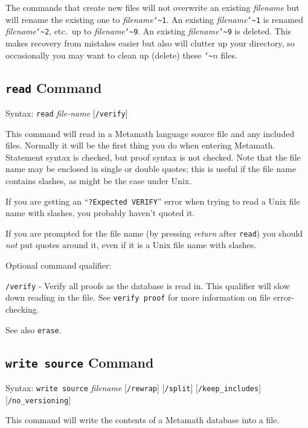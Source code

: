 The commands that create new files will not overwrite an existing {\em
filename} but will rename the existing one to {\em
filename}\texttt{{\char`\~}1}.  An existing {\em
filename}\texttt{{\char`\~}1} is renamed {\em
filename}\texttt{{\char`\~}2}, etc.\ up to {\em
filename}\texttt{{\char`\~}9}.  An existing {\em
filename}\texttt{{\char`\~}9} is deleted.  This makes recovery from
mistakes easier but also will clutter up your directory, so occasionally
you may want to clean up (delete) these \texttt{{\char`\~}}$n$ files.


\subsection{\texttt{read} Command}
Syntax:  \texttt{read} {\em file-name} [\texttt{/verify}]

This command will read in a Metamath language source file and any included
files.  Normally it will be the first thing you do when entering Metamath.
Statement syntax is checked, but proof syntax is not checked.
Note that the file name may be enclosed in single or double quotes;
this is useful if the file name contains slashes, as might be the case
under Unix.

If you are getting an ``\texttt{?Expected VERIFY}'' error
when trying to read a Unix file name with slashes, you probably haven't
quoted it.

If you are prompted for the file name (by pressing {\em return}
 after \texttt{read})
you should {\em not} put quotes around it, even if it is a Unix file name
with slashes.

Optional command qualifier:

    \texttt{/verify} - Verify all proofs as the database is read in.  This
         qualifier will slow down reading in the file.  See \texttt{verify
         proof} for more information on file error-checking.

See also \texttt{erase}.



\subsection{\texttt{write source} Command}
Syntax:  \texttt{write source} {\em filename}
[\texttt{/rewrap}]
[\texttt{/split}]
[\texttt{/keep\_includes}]
[\texttt{/no\_versioning}]

This command will write the contents of a Metamath
database into a file.


